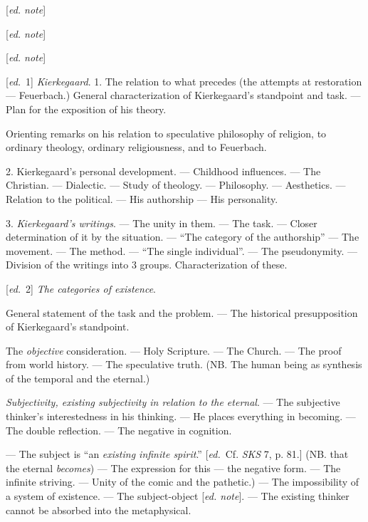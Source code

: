 \documentclass[12pt,a4paper,openany]{book}
\newcommand{\kpage}[1]{\marginnote{\footnotesize\textit{[#1]}}}
\newcommand{\ed}[1]{{\small[\textit{ed.}\ #1]}}
\newcommand{\ednote}[1]{{\small[\textit{ed. note}]}}
\begin{document}
\ednote{}

\ednote{}

\ednote{}

\ed{1} \emph{Kierkegaard}.
1. The relation to what precedes (the attempts at restoration --- Feuerbach.)
General characterization of Kierkegaard's standpoint and
task. --- Plan for the exposition of his theory.

Orienting remarks on his relation to speculative
philosophy of religion, to ordinary theology, ordinary
religiousness, and to Feuerbach.

2. Kierkegaard's personal development. --- Childhood influences.
--- The Christian. --- Dialectic. --- Study of theology.
\kpage{96}--- Philosophy. --- Aesthetics. --- Relation to the political. --- His
authorship --- His personality.

3. \emph{Kierkegaard's writings}. --- The unity in them. --- The task. --- Closer
determination of it by the situation. --- ``The category of the authorship''
--- The movement. --- The method. --- ``The single individual''. --- The pseudonymity.
--- Division of the writings into 3 groups. Characterization of
these.

\ed{2} \emph{The categories of existence}.

General statement of the task and the problem. --- The historical
presupposition of Kierkegaard's standpoint.

The \emph{objective} consideration. --- Holy Scripture. --- The Church. --- The proof from
world history. --- The speculative truth. (NB. The human being
as synthesis of the temporal and the eternal.)

\emph{Subjectivity, existing subjectivity in relation to the eternal}. --- The subjective
thinker's interestedness in his thinking. --- He places everything in
becoming. --- The double reflection. --- The negative in cognition.

--- The subject is ``an \emph{existing infinite spirit}.'' \ed{Cf. \emph{SKS} 7, p. 81.}
(NB. that the eternal \emph{becomes}) --- The expression for this --- the negative
form. --- The infinite striving. --- Unity of the comic and the
pathetic.) --- The impossibility of a system of existence. --- The subject-object
\ednote{}. --- The
existing thinker cannot be absorbed into the metaphysical.
\end{document}
